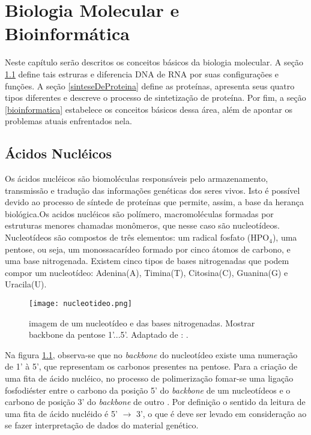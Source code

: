 \chapter{Biologia Molecular e Bioinformática}
 
\indent Neste capítulo serão descritos os conceitos básicos da biologia molecular. A seção \ref{aceidosNucleicos} define tais estruras e diferencia DNA de RNA por suas configurações e funções. A seção \ref{sinteseDeProteina} define as proteínas, apresenta seus quatro tipos diferentes e descreve o processo de sintetização de proteína. Por fim, a seção \ref{bioinformatica} estabelece os conceitos básicos dessa área, além de apontar os problemas atuais enfrentados nela. \\







\section{Ácidos Nucléicos} \label{aceidosNucleicos}

\indent Os ácidos nucléicos são biomoléculas responsáveis pelo armazenamento, transmissão e tradução das informações genéticas dos seres vivos. Isto é possível devido ao processo de síntede de proteínas que permite, assim, a base da herança biológica.Os acidos nucléicos são polímero, macromoléculas formadas por estruturas menores chamadas monômeros, que nesse caso são nucleotídeos. Nucleotídeos são compostos de três elementos: um radical fosfato (HPO$_{4}$), uma pentose, ou seja, um monossacarídeo formado por cinco átomos de carbono, e uma base nitrogenada. Existem cinco tipos de bases nitrogenadas que podem compor um nucleotídeo: Adenina(A), Timina(T), Citosina(C), Guanina(G) e Uracila(U). \\

\begin{figure}[h]
    \centering
    \texttt{[image: nucleotideo.png]}
    \caption{imagem de um nucleotídeo e das bases nitrogenadas. Mostrar backbone da pentose 1'...5'. Adaptado de : \cite{dnadiscovery08}. }
    \label{fig:Nucleotideo}
\end{figure} 

\indent Na figura \ref{fig:Nucleotideo}, observa-se que no \textit{backbone} do nucleotídeo existe uma numeração de 1' à 5', que representam os carbonos presentes na pentose. Para a criação de uma fita de ácido nucléico, no processo de polimerização fomar-se uma ligação fosfodiéster entre o carbono da posição 5' do \textit{backbone} de um nucleotídeos e o carbono de posição 3' do \textit{backbone} de outro \cite{setubal97}. Por definição o sentido da leitura de uma fita de ácido nucléido é 5' $\rightarrow$ 3', o que é deve ser levado em consideração ao se fazer interpretação de dados do material genético. \\

